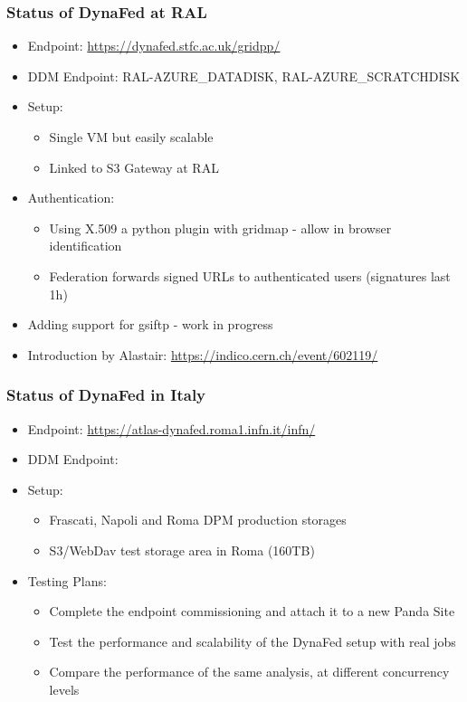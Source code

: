 \documentclass{beamer}
\begin{document}
\begin{frame}
  \frametitle{Status of DynaFed at RAL}
  \begin{itemize}
    \item Endpoint: \url{https://dynafed.stfc.ac.uk/gridpp/}
		\item DDM Endpoint: RAL-AZURE\_DATADISK, RAL-AZURE\_SCRATCHDISK
    \item Setup:
    \begin{itemize}
      \item Single VM but easily scalable
      \item Linked to S3 Gateway at RAL
    \end{itemize}
		\item Authentication:
    \begin{itemize}
      \item Using X.509 a python plugin with gridmap - allow in browser identification
      \item Federation forwards signed URLs to authenticated users (signatures last 1h)
    \end{itemize}
    \item Adding support for gsiftp - work in progress
    \item Introduction by Alastair: \url{https://indico.cern.ch/event/602119/}
  \end{itemize}
\end{frame}

\begin{frame}
  \frametitle{Status of DynaFed in Italy}
  \begin{itemize}
    \item Endpoint: \url{https://atlas-dynafed.roma1.infn.it/infn/}
		\item DDM Endpoint:
    \item Setup:
    \begin{itemize}
      \item Frascati, Napoli and Roma DPM  production storages
      \item S3/WebDav test storage area in Roma (160TB)
    \end{itemize}
		\item Testing Plans:
    \begin{itemize}
      \item Complete the endpoint commissioning and attach it to a new Panda Site
      \item Test the performance and scalability of the DynaFed setup with real jobs
      \item Compare the performance of the same analysis, at different concurrency levels
    \end{itemize}
  \end{itemize}
\end{frame}
\end{document}

